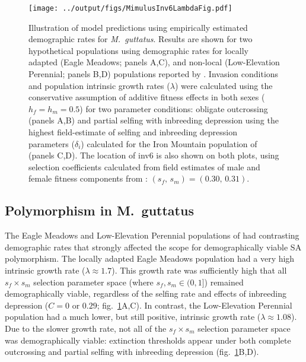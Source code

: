 \documentclass[11pt]{article}
\begin{document}
\begin{figure}[htbp]
 \centering
 \texttt{[image: ../output/figs/MimulusInv6LambdaFig.pdf]}
 \caption{\footnotesize{Illustration of model predictions using empirically estimated demographic rates for {\itshape M.~guttatus}. Results are shown for two hypothetical populations using demographic rates for locally adapted (Eagle Meadows; panels A,C), and non-local (Low-Elevation Perennial; panels B,D) populations reported by \citet{PetersonEtAl2016}. Invasion conditions and population intrinsic growth rates ($\lambda$) were calculated using the conservative assumption of additive fitness effects in both sexes ($h_f = h_m = 0.5$) for two parameter conditions: obligate outcrossing (panels A,B) and partial selfing with inbreeding depression using the highest field-estimate of selfing and inbreeding depression parameters ($\delta_i$) calculated for the Iron Mountain population of \citet{Willis1993} (panels C,D). The location of inv6 is also shown on both plots, using selection coefficients calculated from field estimates of male and female fitness components from \citet{LeeKelly2015}: $(s_f,\,s_m) = (0.30,\, 0.31)$.}} 
 \label{fig:mimulusFig}
 \end{figure}

\subsection*{Polymorphism in M.~guttatus} \label{sec:Mgutt}

The Eagle Meadows and Low-Elevation Perennial populations of \citet{PetersonEtAl2016} had contrasting demographic rates that strongly affected the scope for demographically viable SA polymorphism. The locally adapted Eagle Meadows population had a very high intrinsic growth rate ($\lambda \approx 1.7$). This growth rate was sufficiently high that all $s_f \times s_m$ selection parameter space (where $s_f, s_m \in (0,1]$) remained demographically viable, regardless of the selfing rate and effects of inbreeding depression ($C = 0$ or $0.29$; fig.~\ref{fig:mimulusFig}A,C). In contrast, the Low-Elevation Perennial population had a much lower, but still positive, intrinsic growth rate ($\lambda \approx 1.08$). Due to the slower growth rate, not all of the $s_f \times s_m$ selection parameter space was demographically viable: extinction thresholds appear under both complete outcrossing and partial selfing with inbreeding depression (fig.~\ref{fig:mimulusFig}B,D).
\end{document}
